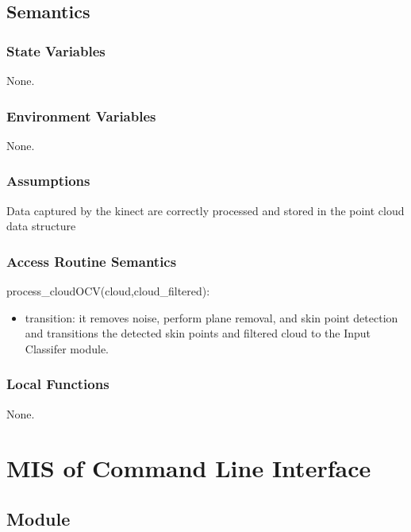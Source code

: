 \documentclass[12pt, titlepage]{article}
\begin{document}
\subsection{Semantics}

\subsubsection{State Variables}

None.

\subsubsection{Environment Variables}

None.

\subsubsection{Assumptions}

Data captured by the kinect are correctly processed and stored in the point cloud data structure

\subsubsection{Access Routine Semantics}

\noindent process\_cloudOCV(cloud,cloud\_filtered):
\begin{itemize}
\item transition: it removes noise, perform plane removal, and skin point detection and transitions the detected skin points and filtered cloud to the Input Classifer module.
\end{itemize}


\subsubsection{Local Functions}

None.

\newpage

\section{MIS of Command Line Interface} \label{ModuleCLI} 

\subsection{Module}
\end{document}
